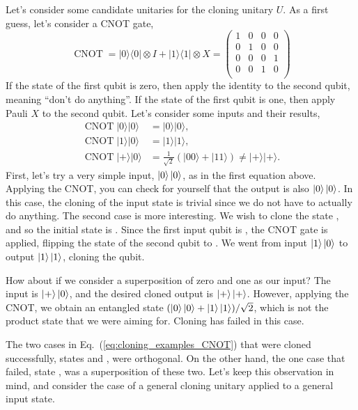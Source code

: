 Let's consider some candidate unitaries for the cloning unitary $U$.
As a first guess, let's consider a CNOT gate,
\begin{equation}
    \operatorname{CNOT} =|0\rangle\langle 0|\otimes I+| 1\rangle\langle 1| \otimes X = \begin{pmatrix}
        1 & 0 & 0 & 0 \\
        0 & 1 & 0 & 0 \\
        0 & 0 & 0 & 1 \\
        0 & 0 & 1 & 0 \\
    \end{pmatrix}
\end{equation}
If the state of the first qubit is zero, then apply the identity to the second qubit, meaning ``don't do anything''.
If the state of the first qubit is one, then apply Pauli $X$ to the second qubit.
Let's consider some inputs and their results,
\begin{equation}
\begin{aligned}
    \operatorname{CNOT} |0\rangle|0\rangle &=|0\rangle|0\rangle, \\
    \operatorname{CNOT} |1\rangle|0\rangle &=|1\rangle|1\rangle, \\
    \operatorname{CNOT} |+\rangle|0\rangle &=\frac{1}{\sqrt{2}}(|00\rangle+|11\rangle)\neq|+\rangle|+\rangle.
    \label{eq:cloning_examples_CNOT}
\end{aligned}
\end{equation}
First, let's try a very simple input, $\left| 0 \right\rangle\left| 0 \right\rangle$, as in the first equation above.
Applying the CNOT, you can check for yourself that the output is also $\left| 0 \right\rangle\left| 0 \right\rangle$.
In this case, the cloning of the input state is trivial since we do not have to actually do anything.
The second case is more interesting.
We wish to clone the state , and so the initial state is .
Since the first input qubit is , the CNOT gate is applied, flipping the state of the second qubit to .
We went from input $\left| 1 \right\rangle\left| 0 \right\rangle$ to output $\left| 1 \right\rangle\left| 1 \right\rangle$, cloning the qubit.

How about if we consider a superposition of zero and one as our input? The input is $\left| + \right\rangle\left| 0 \right\rangle$, and the desired cloned output is $\left| + \right\rangle\left| + \right\rangle$.
However, applying the CNOT, we obtain an entangled state $(\left| 0 \right\rangle\left| 0 \right\rangle+\left| 1 \right\rangle\left| 1 \right\rangle)/\sqrt{2}$, which is not the product state that we were aiming for. Cloning has failed in this case.

The two cases in Eq.~(\ref{eq:cloning_examples_CNOT}) that were cloned successfully, states  and , were orthogonal.
On the other hand, the one case that failed, state \ket{+}, was a superposition of these two.
Let's keep this observation in mind, and consider the case of a general cloning unitary applied to a general input state.

